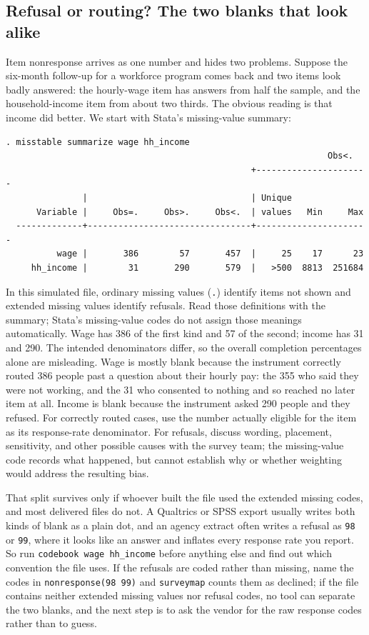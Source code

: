 \subsection{Refusal or routing? The two blanks that look alike}\label{sec:ch05-surveymap}
Item nonresponse arrives as one number and hides two problems. Suppose the six-month follow-up for a workforce program comes back and two items look badly answered: the hourly-wage item has answers from half the sample, and the household-income item from about two thirds. The obvious reading is that income did better. We start with Stata's missing-value summary:
\par
{\footnotesize
\begin{verbatim}
. misstable summarize wage hh_income
                                                               Obs<.
                                                +----------------------
               |                                | Unique
      Variable |     Obs=.     Obs>.     Obs<.  | values   Min     Max
  -------------+--------------------------------+----------------------
          wage |       386        57       457  |     25    17      23
     hh_income |        31       290       579  |   >500  8813  251684
\end{verbatim}
}
In this simulated file, ordinary missing values (\texttt{.}) identify items not shown and extended missing values identify refusals. Read those definitions with the summary; Stata's missing-value codes do not assign those meanings automatically. Wage has 386 of the first kind and 57 of the second; income has 31 and 290. The intended denominators differ, so the overall completion percentages alone are misleading. Wage is mostly blank because the instrument correctly routed 386 people past a question about their hourly pay: the 355 who said they were not working, and the 31 who consented to nothing and so reached no later item at all. Income is blank because the instrument asked 290 people and they refused. For correctly routed cases, use the number actually eligible for the item as its response-rate denominator. For refusals, discuss wording, placement, sensitivity, and other possible causes with the survey team; the missing-value code records what happened, but cannot establish why or whether weighting would address the resulting bias.

That split survives only if whoever built the file used the extended missing codes, and most delivered files do not. A Qualtrics or SPSS export usually writes both kinds of blank as a plain dot, and an agency extract often writes a refusal as \texttt{98} or \texttt{99}, where it looks like an answer and inflates every response rate you report. So run \texttt{codebook wage hh\_income} before anything else and find out which convention the file uses. If the refusals are coded rather than missing, name the codes in \texttt{nonresponse(98 99)} and \texttt{surveymap} counts them as declined; if the file contains neither extended missing values nor refusal codes, no tool can separate the two blanks, and the next step is to ask the vendor for the raw response codes rather than to guess.

